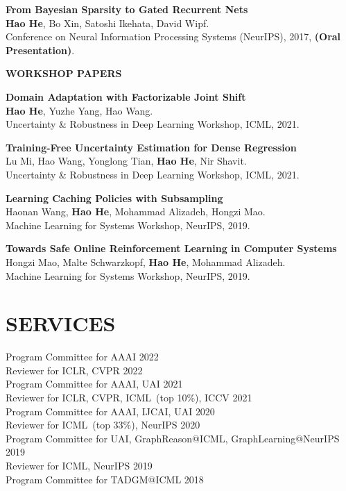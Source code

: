 \documentclass[margin]{res}
\begin{document}
\begin{resume}
\textbf{From Bayesian Sparsity to Gated Recurrent Nets}\\
\textbf{Hao He}, Bo Xin, Satoshi Ikehata, David Wipf.\\
Conference on Neural Information Processing Systems (NeurIPS), 2017, \textbf{(Oral Presentation)}.

\textbf{WORKSHOP PAPERS}

\textbf{Domain Adaptation with Factorizable Joint Shift}\\
\textbf{Hao He}, Yuzhe Yang, Hao Wang.\\
Uncertainty \& Robustness in Deep Learning Workshop, ICML, 2021.

\textbf{Training-Free Uncertainty Estimation for Dense Regression}\\
Lu Mi, Hao Wang, Yonglong Tian, \textbf{Hao He}, Nir Shavit.\\
Uncertainty \& Robustness in Deep Learning Workshop, ICML, 2021.

\textbf{Learning Caching Policies with Subsampling}\\
Haonan Wang, \textbf{Hao He}, Mohammad Alizadeh, Hongzi Mao.\\
Machine Learning for Systems Workshop, NeurIPS, 2019.

\textbf{Towards Safe Online Reinforcement Learning in Computer Systems}\\
Hongzi Mao, Malte Schwarzkopf, \textbf{Hao He}, Mohammad Alizadeh.\\
Machine Learning for Systems Workshop, NeurIPS, 2019.



\section{SERVICES}
Program Committee for AAAI \hfill{2022}\\
Reviewer for ICLR, CVPR  \hfill{2022}\\
Program Committee for AAAI, UAI \hfill{2021}\\
Reviewer for ICLR, CVPR, ICML~(top 10\%), ICCV \hfill{2021}\\
Program Committee for AAAI, IJCAI, UAI \hfill{2020}\\
Reviewer for ICML~(top 33\%), NeurIPS \hfill{2020}\\
Program Committee for UAI, GraphReason@ICML, GraphLearning@NeurIPS \hfill{2019}\\
Reviewer for ICML, NeurIPS \hfill{2019}\\
Program Committee for TADGM@ICML \hfill{2018}\\


\end{resume}
\end{document}
